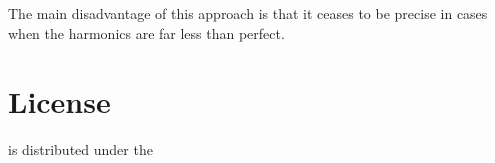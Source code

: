 The main disadvantage of this approach is that it ceases to be precise in cases when the harmonics are far less than perfect.

\appendix

\chapter{License}\label{license}

 is distributed under the 




